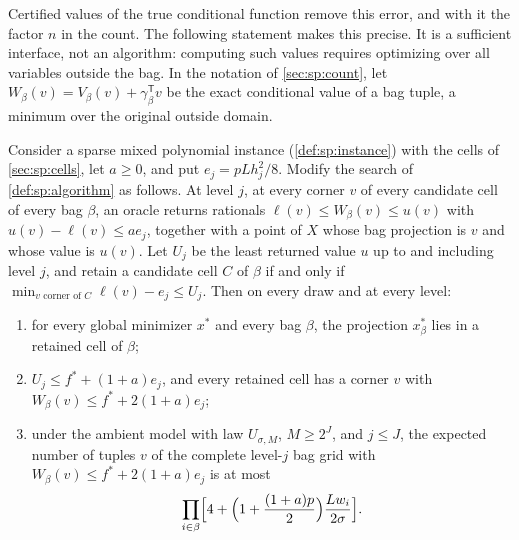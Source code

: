 Certified values of the true conditional function remove this error, and
with it the factor $n$ in the count. The following statement makes this
precise. It is a sufficient interface, not an algorithm: computing such
values requires optimizing over all variables outside the bag. In the
notation of \cref{sec:sp:count}, let
$W_\beta(v)=V_\beta(v)+\gamma_\beta^{\mathsf T}v$ be the exact conditional
value of a bag tuple, a minimum over the original outside domain.

\begin{proposition}\label{prop:lim:conditional}
Consider a sparse mixed polynomial instance (\cref{def:sp:instance}) with
the cells of \cref{sec:sp:cells}, let $a\ge0$, and put
$e_j=pLh_j^2/8$. Modify the search of \cref{def:sp:algorithm} as follows. At
level $j$, at every corner $v$ of every candidate cell of every bag $\beta$,
an oracle returns rationals $\ell(v)\le W_\beta(v)\le u(v)$ with
$u(v)-\ell(v)\le ae_j$, together with a point of $X$ whose bag projection is
$v$ and whose value is $u(v)$. Let $U_j$ be the least returned value $u$ up to
and including level $j$, and retain a candidate cell $C$ of $\beta$ if and
only if $\min_{v\text{ corner of }C}\ell(v)-e_j\le U_j$. Then on every draw
and at every level:
\begin{enumerate}[label=(\alph*)]
\item\label{it:lim:cond-sound} for every global minimizer $x^*$ and every
bag $\beta$, the projection $x^*_\beta$ lies in a retained cell of $\beta$;
\item\label{it:lim:cond-witness} $U_j\le f^*+(1+a)e_j$, and every retained
cell has a corner $v$ with $W_\beta(v)\le f^*+2(1+a)e_j$;
\item\label{it:lim:cond-count} under the ambient model with law $U_{\sigma,M}$,
$M\ge2^J$, and $j\le J$, the expected number of tuples $v$ of the complete
level-$j$ bag grid with $W_\beta(v)\le f^*+2(1+a)e_j$ is at most
\[
 \prod_{i\in\beta}\Bigl[4+\Bigl(1+\frac{(1+a)p}2\Bigr)\frac{Lw_i}{2\sigma}\Bigr].
\]
\end{enumerate}
\end{proposition}

